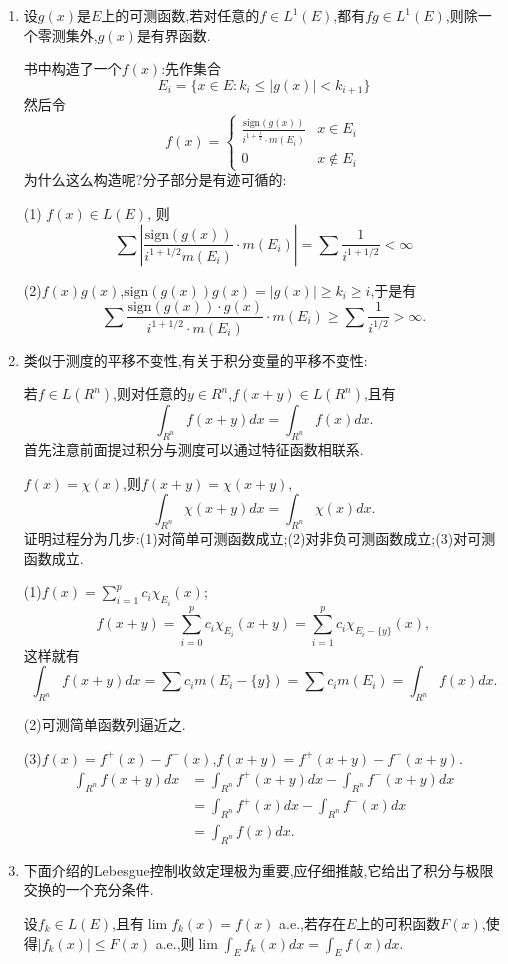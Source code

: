\documentclass[12pt,a4paper,openany]{book}
\begin{document}
\begin{enumerate}
\item 设$g(x)$是$E$上的可测函数,若对任意的$f \in L^1(E)$,都有$fg \in L^1(E)$,则除一个零测集外,$g(x)$是有界函数.

书中构造了一个$f(x)$:先作集合
\[
E_i = \{x \in E: k_i \le |g(x)| < k_{i+1}\}
\]
然后令
\[
f(x) = \begin{cases}
\frac{\text{sign}(g(x))}{i^{1 + \frac{1}{2}} \cdot m(E_i)} & x \in E_i \\
0& x \notin E_i
\end{cases}
\]
为什么这么构造呢?分子部分是有迹可循的:

(1) $f(x) \in L(E)$, 则
\[
\sum|\frac{\text{sign}(g(x))}{i^{1 + 1/2}m(E_i)} \cdot m(E_i)| = \sum{\frac{1}{i^{1 + 1/2}}} < \infty
\]

(2)$f(x)g(x)$,$\text{sign}(g(x))g(x) = |g(x)| \ge k_i \ge i$,于是有
\[
\sum{\frac{\text{sign}(g(x)) \cdot g(x)}{i^{1+1/2} \cdot m(E_i)} \cdot m(E_i)} \ge \sum{\frac{1}{i^{1/2}}} > \infty.
\]

\item 类似于测度的平移不变性,有关于积分变量的平移不变性:

若$f \in L(R^n)$,则对任意的$y \in R^n$,$f(x+y) \in L(R^n)$,且有
\[
\int_{R^n}{f(x+y)dx} = \int_{R^n}{f(x)dx}.
\]
首先注意前面提过积分与测度可以通过特征函数相联系.

$f(x) = \chi(x)$,则$f(x+y) = \chi(x+y)$,
\[
\int_{R^n}{\chi(x+y)dx} = \int_{R^n}{\chi(x)dx}.
\]
证明过程分为几步:(1)对简单可测函数成立;(2)对非负可测函数成立;(3)对可测函数成立.

(1)$f(x) = \sum_{i=1}^{p}{c_i\chi_{E_i}(x)}$;
\[
f(x + y) = \sum_{i=0}^{p}{c_i\chi_{E_i}(x+y)} = \sum_{i=1}^{p}{c_i\chi_{E_i - \{y\}}(x)},
\]
这样就有
\[
\int_{R^n}{f(x+y)dx} = \sum{c_im(E_i - \{y\})} = \sum{c_im(E_i)} = \int_{R^n}{f(x)dx}.
\]

(2)可测简单函数列逼近之.

(3)$f(x) = f^+(x) - f^-(x)$,$f(x+y)=f^+(x+y)-f^-(x+y)$.
\[
\begin{aligned}
\int_{R^n}{f(x+y)dx} &= \int_{R^n}{f^+(x+y)dx} - \int_{R^n}{f^-(x+y)dx} \\
&=\int_{R^n}{f^+(x)dx} - \int_{R^n}{f^-(x)dx} \\
&=\int_{R^n}{f(x)dx}.
\end{aligned}
\]

\item 下面介绍的Lebesgue控制收敛定理极为重要,应仔细推敲,它给出了积分与极限交换的一个充分条件.

设$f_k \in L(E)$,且有$\lim{f_k(x)}=f(x)$ a.e.,若存在$E$上的可积函数$F(x)$,使得$|f_k(x)| \le F(x)$ a.e.,则$\lim{\int_{E}{f_k(x)dx}} = \int_{E}{f(x)dx}$.


\end{enumerate}
\end{document}
